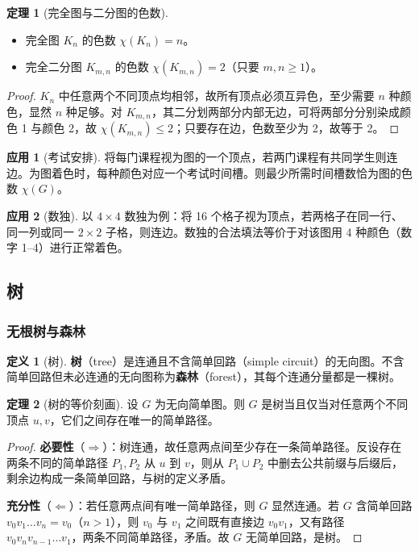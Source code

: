 \documentclass[UTF8,11pt,a4paper]{ctexbook}   %
\theoremstyle{definition}
\newtheorem{definition}{定义}[section]
\newtheorem{theorem}{定理}[section]
\newtheorem{application}{应用}[section]
\begin{document}
\begin{theorem}[完全图与二分图的色数]
\begin{itemize}
    \item 完全图 $K_n$ 的色数 $\chi(K_n)=n$。
    \item 完全二分图 $K_{m,n}$ 的色数 $\chi(K_{m,n})=2$（只要 $m,n\ge 1$）。
\end{itemize}
\end{theorem}

\begin{proof}
$K_n$ 中任意两个不同顶点均相邻，故所有顶点必须互异色，至少需要 $n$ 种颜色，显然 $n$ 种足够。对 $K_{m,n}$，其二分划两部分内部无边，可将两部分分别染成颜色 1 与颜色 2，故 $\chi(K_{m,n})\le 2$；只要存在边，色数至少为 2，故等于 2。
\end{proof}

\begin{application}[考试安排]
将每门课程视为图的一个顶点，若两门课程有共同学生则连边。为图着色时，每种颜色对应一个考试时间槽。则最少所需时间槽数恰为图的色数 $\chi(G)$。
\end{application}

\begin{application}[数独]
以 $4\times 4$ 数独为例：将 16 个格子视为顶点，若两格子在同一行、同一列或同一 $2\times 2$ 子格，则连边。数独的合法填法等价于对该图用 4 种颜色（数字 1--4）进行正常着色。
\end{application}

\subsection{树}

\subsubsection{无根树与森林}

\begin{definition}[树]
\textbf{树}（tree）是连通且不含简单回路（simple circuit）的无向图。不含简单回路但未必连通的无向图称为\textbf{森林}（forest），其每个连通分量都是一棵树。
\end{definition}

\begin{theorem}[树的等价刻画]
设 $G$ 为无向简单图。则 $G$ 是树当且仅当对任意两个不同顶点 $u,v$，它们之间存在唯一的简单路径。
\end{theorem}

\begin{proof}
\textbf{必要性}（$\Rightarrow$）：树连通，故任意两点间至少存在一条简单路径。反设存在两条不同的简单路径 $P_1,P_2$ 从 $u$ 到 $v$，则从 $P_1\cup P_2$ 中删去公共前缀与后缀后，剩余边构成一条简单回路，与树的定义矛盾。

\textbf{充分性}（$\Leftarrow$）：若任意两点间有唯一简单路径，则 $G$ 显然连通。若 $G$ 含简单回路 $v_0v_1\dots v_n=v_0$（$n>1$），则 $v_0$ 与 $v_1$ 之间既有直接边 $v_0v_1$，又有路径 $v_0v_n v_{n-1}\dots v_1$，两条不同简单路径，矛盾。故 $G$ 无简单回路，是树。
\end{proof}
\end{document}
